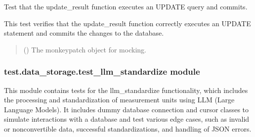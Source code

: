 \documentclass[letterpaper,10pt,english]{sphinxmanual}
\begin{document}

\begin{fulllineitems}
\label{\detokenize{test.data_storage:test.data_storage.test_llm_analyse.test_update_result_executes_commit}}
\pysigstartsignatures
\pysiglinewithargsret
{}
{}
{}
\pysigstopsignatures
\sphinxAtStartPar
Test that the update\_result function executes an UPDATE query and commits.

\sphinxAtStartPar
This test verifies that the update\_result function correctly executes
an UPDATE statement and commits the changes to the database.
\begin{quote}\begin{description}
\sphinxAtStartPar
{} () \textendash{} The monkeypatch object for mocking.

\end{description}\end{quote}

\end{fulllineitems}



\subsubsection{test.data\_storage.test\_llm\_standardize module}
\label{\detokenize{test.data_storage:module-test.data_storage.test_llm_standardize}}\label{\detokenize{test.data_storage:test-data-storage-test-llm-standardize-module}}
\sphinxAtStartPar
This module contains tests for the llm\_standardize functionality, which includes the processing and standardization
of measurement units using LLM (Large Language Models). It includes dummy database connection and cursor classes to
simulate interactions with a database and test various edge cases, such as invalid or non\sphinxhyphen{}convertible data, successful
standardizations, and handling of JSON errors.
\end{document}
